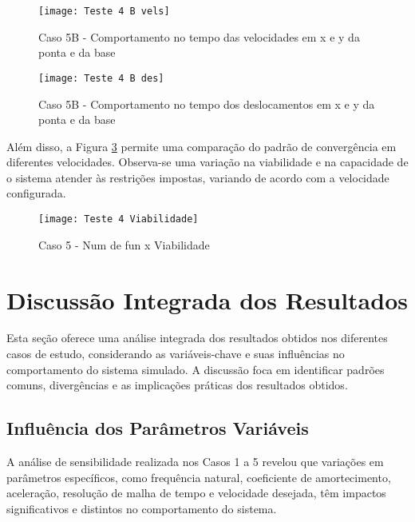 \begin{figure}[H]
    \begin{center}
    \caption{Caso 5B - Comportamento no tempo das velocidades em x e y da ponta e da base}
    \texttt{[image: Teste 4 B vels]}
    \label{fig:t_4b_vels}
    \end{center}
\end{figure}

\begin{figure}[H]
    \begin{center}
    \caption{Caso 5B - Comportamento no tempo dos deslocamentos em x e y da ponta e da base}
    \texttt{[image: Teste 4 B des]}
    \label{fig:t_4b_des}
    \end{center}
\end{figure}

Além disso, a Figura \ref{fig:t_4_viab} permite uma comparação do padrão de convergência em diferentes velocidades. Observa-se uma variação na viabilidade e na capacidade de o sistema atender às restrições impostas, variando de acordo com a velocidade configurada.

\begin{figure}[H]
    \begin{center}
    \caption{Caso 5 - Num de fun x Viabilidade}
    \texttt{[image: Teste 4 Viabilidade]}
    \label{fig:t_4_viab}
    \end{center}
\end{figure}

\section{Discussão Integrada dos Resultados}
Esta seção oferece uma análise integrada dos resultados obtidos nos diferentes casos de estudo, considerando as variáveis-chave e suas influências no comportamento do sistema simulado. A discussão foca em identificar padrões comuns, divergências e as implicações práticas dos resultados obtidos.

\subsection{Influência dos Parâmetros Variáveis}
A análise de sensibilidade realizada nos Casos 1 a 5 revelou que variações em parâmetros específicos, como frequência natural, coeficiente de amortecimento, aceleração, resolução de malha de tempo e velocidade desejada, têm impactos significativos e distintos no comportamento do sistema. 

